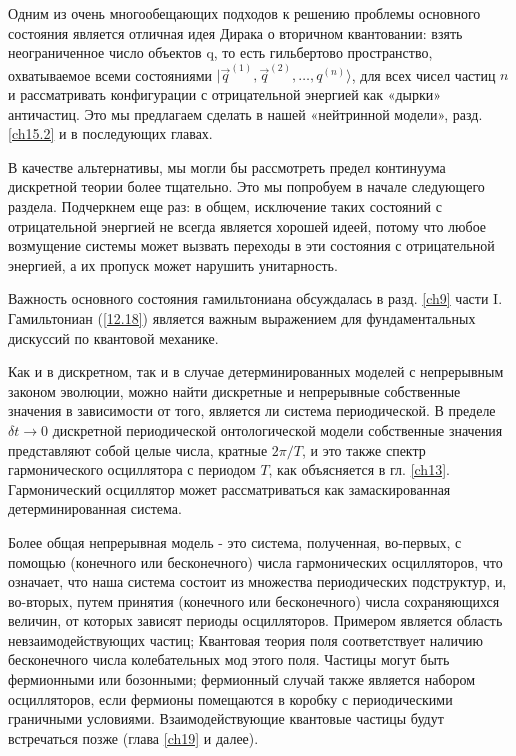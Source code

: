 \documentclass[main.tex]{subfiles}
\begin{document}
Одним из очень многообещающих подходов к решению проблемы основного состояния является отличная идея Дирака о вторичном квантовании: взять неограниченное число объектов q, то есть гильбертово пространство, охватываемое всеми состояниями $| \vec q^{(1)}, \vec q^{(2)},\ldots, q^{(n)}\rangle$, для всех чисел частиц $n$ и рассматривать конфигурации с отрицательной энергией как «дырки» античастиц. Это мы предлагаем сделать в нашей «нейтринной модели», разд. \ref{ch15.2} и в последующих главах.

В качестве альтернативы, мы могли бы рассмотреть предел континуума дискретной теории более тщательно. Это мы попробуем в начале следующего раздела. Подчеркнем еще раз: в общем, исключение таких состояний с отрицательной энергией не всегда является хорошей идеей, потому что любое возмущение системы может вызвать переходы в эти состояния с отрицательной энергией, а их пропуск может нарушить унитарность.

Важность основного состояния гамильтониана обсуждалась в разд. \ref{ch9} части I. Гамильтониан (\ref{12.18}) является важным выражением для фундаментальных дискуссий по квантовой механике.

Как и в дискретном, так и в случае детерминированных моделей с непрерывным законом эволюции, можно найти дискретные и непрерывные собственные значения в зависимости от того, является ли система периодической. В пределе $\delta t \rightarrow 0$ дискретной периодической онтологической модели собственные значения представляют собой целые числа, кратные $2\pi / T$, и это также спектр гармонического осциллятора с периодом $T$, как объясняется в гл. \ref{ch13}. Гармонический осциллятор может рассматриваться как замаскированная детерминированная система.

Более общая непрерывная модель - это система, полученная, во-первых, с помощью (конечного или бесконечного) числа гармонических осцилляторов, что означает, что наша система состоит из множества периодических подструктур, и, во-вторых, путем принятия (конечного или бесконечного) числа сохраняющихся величин, от которых зависят периоды осцилляторов. Примером является область невзаимодействующих частиц; Квантовая теория поля соответствует наличию бесконечного числа колебательных мод этого поля. Частицы могут быть фермионными или бозонными; фермионный случай также является набором осцилляторов, если фермионы помещаются в коробку с периодическими граничными условиями. Взаимодействующие квантовые частицы будут встречаться позже (глава \ref{ch19} и далее).
\end{document}

